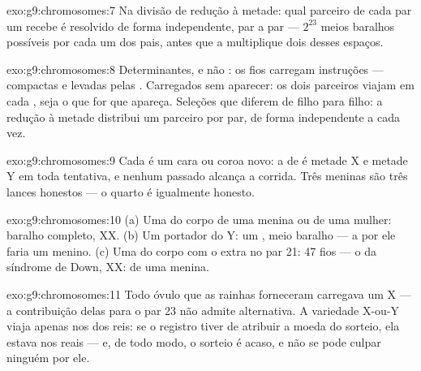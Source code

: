 \begin{solution}{exo:g9:chromosomes:7}
Na divisão de redução à metade: qual parceiro de cada par um
 recebe é resolvido de forma independente, par a par
--- $2^{23}$ meios baralhos possíveis por cada um dos pais,
antes que a  multiplique dois desses espaços.
\end{solution}

\begin{solution}{exo:g9:chromosomes:8}
Determinantes, e não : os fios carregam
instruções --- compactas e levadas pelas .
Carregados sem aparecer: os dois parceiros viajam em cada
, seja o que for que apareça. Seleções que diferem de
filho para filho: a redução à metade distribui um parceiro
por par, de forma independente a cada vez.
\end{solution}

\begin{solution}{exo:g9:chromosomes:9}
Cada  é um cara ou coroa novo: a  de
 é metade X e metade Y em toda tentativa, e
nenhum  passado alcança a corrida. Três meninas
são três lances honestos --- o quarto é igualmente honesto.
\end{solution}

\begin{solution}{exo:g9:chromosomes:10}
(a) Uma  do corpo de uma menina ou de uma mulher:
baralho completo, XX. (b) Um  portador do Y:
um , meio baralho --- a  por ele faria um
menino. (c) Uma  do corpo com o extra no par 21: 47
fios --- o  da síndrome de Down, XX: de uma menina.
\end{solution}

\begin{solution}{exo:g9:chromosomes:11}
Todo óvulo que as rainhas forneceram carregava um X --- a
contribuição delas para o par 23 não admite alternativa. A
variedade X-ou-Y viaja apenas nos  dos reis: se o
registro tiver de atribuir a moeda do sorteio, ela estava
nos  reais --- e, de todo modo, o sorteio é
acaso, e não se pode culpar ninguém por ele.
\end{solution}

